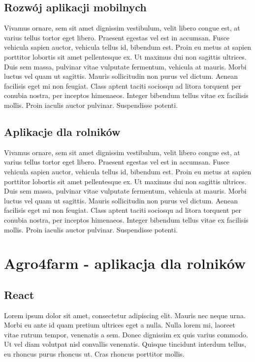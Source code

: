 \documentclass[a4paper,12pt,oneside]{book}
\begin{document}
	\section{Rozwój aplikacji mobilnych}
	Vivamus ornare, sem sit amet dignissim vestibulum, velit libero congue est, at varius tellus tortor eget libero. Praesent egestas vel est in accumsan. Fusce vehicula sapien auctor, vehicula tellus id, bibendum est. Proin eu metus at sapien porttitor lobortis sit amet pellentesque ex. Ut maximus dui non sagittis ultrices. Duis sem massa, pulvinar vitae vulputate fermentum, vehicula at mauris. Morbi luctus vel quam ut sagittis. Mauris sollicitudin non purus vel dictum. Aenean facilisis eget mi non feugiat. Class aptent taciti sociosqu ad litora torquent per conubia nostra, per inceptos himenaeos. Integer bibendum tellus vitae ex facilisis mollis. Proin iaculis auctor pulvinar. Suspendisse potenti.
	\section{Aplikacje dla rolników}
	Vivamus ornare, sem sit amet dignissim vestibulum, velit libero congue est, at varius tellus tortor eget libero. Praesent egestas vel est in accumsan. Fusce vehicula sapien auctor, vehicula tellus id, bibendum est. Proin eu metus at sapien porttitor lobortis sit amet pellentesque ex. Ut maximus dui non sagittis ultrices. Duis sem massa, pulvinar vitae vulputate fermentum, vehicula at mauris. Morbi luctus vel quam ut sagittis. Mauris sollicitudin non purus vel dictum. Aenean facilisis eget mi non feugiat. Class aptent taciti sociosqu ad litora torquent per conubia nostra, per inceptos himenaeos. Integer bibendum tellus vitae ex facilisis mollis. Proin iaculis auctor pulvinar. Suspendisse potenti.
	
	\newpage
	\chapter{Agro4farm - aplikacja dla rolników}
	
	\section{React}
	Lorem ipsum dolor sit amet, consectetur adipiscing elit. Mauris nec neque urna. Morbi eu ante id quam pretium ultrices eget a nulla. Nulla lorem mi, laoreet vitae rutrum tempor, venenatis a sem. Donec dignissim ex quis varius commodo. Ut vel diam volutpat nisl convallis venenatis. Quisque tincidunt interdum tellus, eu rhoncus purus rhoncus ut. Cras rhoncus porttitor mollis.
	
\end{document}

